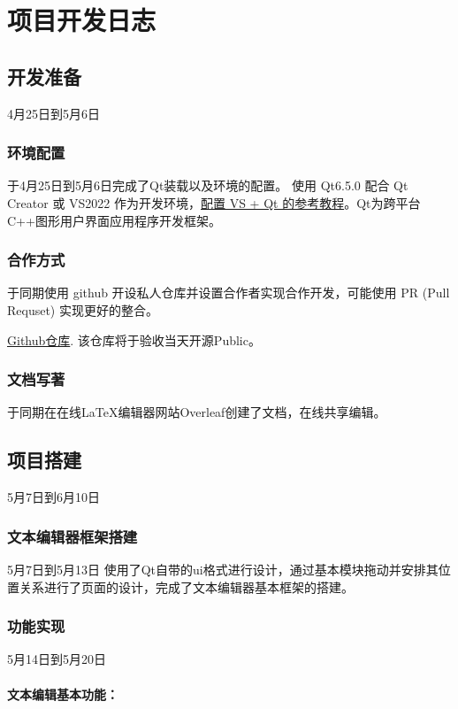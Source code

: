 \documentclass{./source/Report}
\begin{document}
\newpage
\appendix

\section{项目开发日志}
\subsection{开发准备}
4月25日到5月6日
\subsubsection{环境配置}
 于4月25日到5月6日完成了Qt装载以及环境的配置。
使用 Qt6.5.0 配合 Qt Creator 或 VS2022 作为开发环境，\href{https://blog.csdn.net/m0_62919535/article/details/129340079}{配置 VS + Qt 的参考教程}。Qt为跨平台C++图形用户界面应用程序开发框架。

\subsubsection{合作方式}
于同期使用 github 开设私人仓库并设置合作者实现合作开发，可能使用 PR (Pull Requset) 实现更好的整合。\par
\href{https://github.com/calcualatexzy/zword.git}{Github仓库}.
该仓库将于验收当天开源Public。

\subsubsection{文档写著}
  于同期在在线LaTeX编辑器网站Overleaf创建了文档，在线共享编辑。
\subsection{项目搭建}
5月7日到6月10日
\subsubsection{文本编辑器框架搭建}
5月7日到5月13日
使用了Qt自带的ui格式进行设计，通过基本模块拖动并安排其位置关系进行了页面的设计，完成了文本编辑器基本框架的搭建。
\subsubsection{功能实现}
5月14日到5月20日

\paragraph{文本编辑基本功能：}
\end{document}
